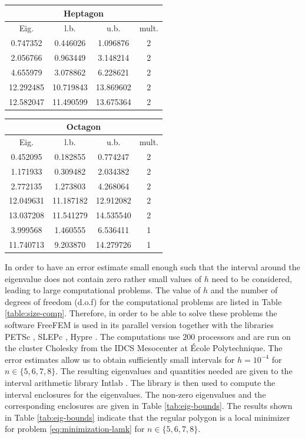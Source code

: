 \documentclass[11pt]{article}
\numberwithin{equation}{section}\newtheorem*{jepEnonce}{\jepEnonceTitle}\newenvironment{enonce*}[1]{\def\jepEnonceTitle{#1}\jepEnonce}{\endjepEnonce}\newtheorem*{conj*}{Conjecture}
\theoremstyle{plain}
\theoremstyle{definition}
\begin{document}
\begin{table}[htb]
\raisebox{12.5pt}
{\begin{minipage}{.49\textwidth}
\begin{tabular}{|c|c|c|c|}
\hline
\multicolumn{4}{|c|}{Heptagon} \\
\hline
Eig. & l.b. & u.b. & mult. \\ \hline
0.747352 & 0.446026 & 1.096876 & 2\\ \hline
2.056766 & 0.963449 & 3.148214 & 2\\ \hline
4.655979 & 3.078862 & 6.228621 & 2\\ \hline
12.292485 & 10.719843 & 13.869602 &2 \\ \hline
12.582047 & 11.490599 & 13.675364 & 2 \\ \hline
\end{tabular}
\end{minipage}}
\begin{minipage}[t]{.49\textwidth}
\begin{tabular}{|c|c|c|c|}
\hline
\multicolumn{4}{|c|}{Octagon} \\
\hline
Eig. & l.b. & u.b. & mult. \\ \hline
0.452095 & 0.182855 & 0.774247 & 2\\ \hline
1.171933 & 0.309482 & 2.034382 & 2\\ \hline
2.772135 & 1.273803 & 4.268064 & 2\\ \hline
12.049631 & 11.187182 & 12.912082 & 2 \\ \hline
13.037208 & 11.541279 & 14.535540 & 2 \\ \hline
3.999568 & 1.460555 & 6.536411 & 1\\ \hline
11.740713 & 9.203870 & 14.279726 & 1 \\ \hline
\end{tabular}
\end{minipage}
\end{table}

In order to have an error estimate small enough such that the interval around the eigenvalue does not contain zero rather small values of $h$ need to be considered, leading to large computational problems. The value of $h$ and the number of degrees of freedom (d.o.f) for the computational problems are listed in Table \ref{table:size-comp}.
Therefore, in order to be able to solve these problems the software FreeFEM \cite{freefem} is used in its parallel version together with the libraries PETSc \cite{petsc}, SLEPc \cite{slepc}, Hypre \cite{hypre}. The computations use $200$ processors and are run on the cluster Cholesky from the IDCS Mesocenter at École Polytechnique. The error estimates allow us to obtain sufficiently small intervals for $h=10^{-4}$ for $n \in \{5,6,7,8\}$. The resulting eigenvalues and quantities needed are given to the interval arithmetic library Intlab \cite{intlab}. The library is then used to compute the interval enclosures for the eigenvalues. The non-zero eigenvalues and the corresponding enclosures are given in Table \ref{tab:eig-bounds}. The results shown in Table \ref{tab:eig-bounds} indicate that the regular polygon is a local minimizer for problem \eqref{eq:minimization-lamk} for $n \in \{5,6,7,8\}$.
\end{document}
